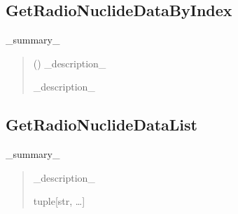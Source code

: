 \documentclass[letterpaper,10pt,english,openany,oneside]{sphinxmanual}
\begin{document}
\subsection{GetRadioNuclideDataByIndex}
\label{\detokenize{api/radionuclides:getradionuclidedatabyindex}}

\begin{fulllineitems}
\label{\detokenize{api/radionuclides:dxraylib.GetRadioNuclideDataByIndex}}
\pysigstartsignatures
{}
\pysigstopsignatures
\sphinxAtStartPar
\_summary\_
\begin{quote}\begin{description}
\sphinxAtStartPar
{} () \textendash{} \_description\_

\sphinxAtStartPar
\_description\_

\sphinxAtStartPar
{\hyperref[\detokenize{api/radionuclides:dxraylib.xraylib_radionuclides.radioNuclideData}]{}}

\end{description}\end{quote}

\end{fulllineitems}



\subsection{GetRadioNuclideDataList}
\label{\detokenize{api/radionuclides:getradionuclidedatalist}}

\begin{fulllineitems}
\label{\detokenize{api/radionuclides:dxraylib.GetRadioNuclideDataList}}
\pysigstartsignatures
{}
\pysigstopsignatures
\sphinxAtStartPar
\_summary\_
\begin{quote}\begin{description}
\sphinxAtStartPar
\_description\_

\sphinxAtStartPar
tuple{[}str, …{]}

\end{description}\end{quote}

\end{fulllineitems}
\end{document}
